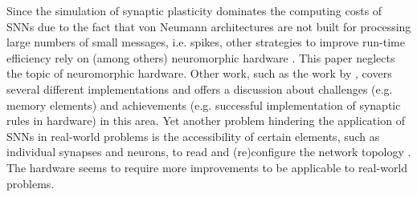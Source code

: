 Since the simulation of synaptic plasticity dominates the computing costs of \acp{SNN} due to the fact that von Neumann architectures are not built 
for processing large numbers of small messages, i.e. spikes, 
other strategies to improve run-time efficiency rely on (among others) neuromorphic hardware \cite{simulation_STDP}.
This paper neglects the topic of neuromorphic hardware.
Other work, such as the work by \authorsSynapticPlasticity{} \cite{Synaptic_plasticity}, 
covers several different implementations and offers a discussion about challenges (e.g. memory elements) and achievements 
(e.g. successful implementation of synaptic rules in hardware) in this area.
Yet another problem hindering the application of \acp{SNN} in real-world problems is the accessibility of certain elements, such as individual synapses and neurons, 
to read and (re)configure the network topology \cite{hardware_STDP}.
The hardware seems to require more improvements to be applicable to real-world problems.
